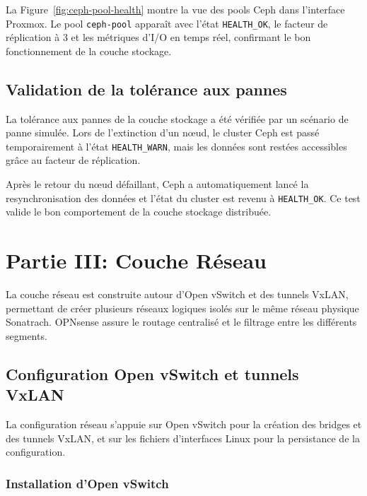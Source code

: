 \par La Figure~\ref{fig:ceph-pool-health} montre la vue des pools Ceph dans l'interface Proxmox. Le pool \texttt{ceph-pool} apparaît avec l'état \texttt{HEALTH\_OK}, le facteur de réplication à 3 et les métriques d'I/O en temps réel, confirmant le bon fonctionnement de la couche stockage.\\

\subsection{Validation de la tolérance aux pannes}

\par La tolérance aux pannes de la couche stockage a été vérifiée par un scénario de panne simulée. Lors de l'extinction d'un nœud, le cluster Ceph est passé temporairement à l'état \texttt{HEALTH\_WARN}, mais les données sont restées accessibles grâce au facteur de réplication.

\par Après le retour du nœud défaillant, Ceph a automatiquement lancé la resynchronisation des données et l'état du cluster est revenu à \texttt{HEALTH\_OK}. Ce test valide le bon comportement de la couche stockage distribuée.

\section{Partie III: Couche Réseau}

\par La couche réseau est construite autour d'Open vSwitch et des tunnels VxLAN, permettant de créer plusieurs réseaux logiques isolés sur le même réseau physique Sonatrach. OPNsense assure le routage centralisé et le filtrage entre les différents segments.

\subsection{Configuration Open vSwitch et tunnels VxLAN}

\par La configuration réseau s'appuie sur Open vSwitch pour la création des bridges et des tunnels VxLAN, et sur les fichiers d'interfaces Linux pour la persistance de la configuration.

\subsubsection{Installation d'Open vSwitch}

